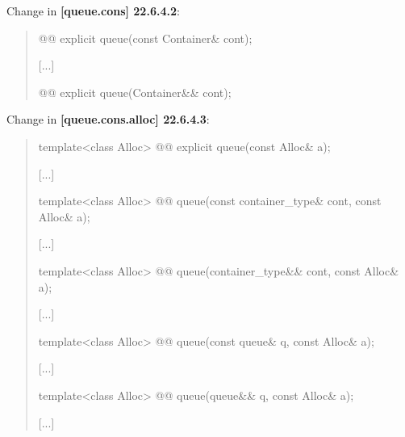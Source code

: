 \documentclass{wg21}
\begin{document}
Change in \textbf{[queue.cons] 22.6.4.2}:
\begin{quote}
\begin{itemdecl}
@@ explicit queue(const Container& cont);
\end{itemdecl}
[...]
\begin{itemdecl}
@@ explicit queue(Container&& cont);
\end{itemdecl}
\end{quote}

Change in \textbf{[queue.cons.alloc] 22.6.4.3}:
\begin{quote}
\begin{itemdecl}
template<class Alloc> @@ explicit queue(const Alloc& a);
\end{itemdecl}
[...]
\begin{itemdecl}
template<class Alloc> @@ queue(const container_type& cont, const Alloc& a);	
\end{itemdecl}
[...]
\begin{itemdecl}
template<class Alloc> @@ queue(container_type&& cont, const Alloc& a);
\end{itemdecl}
[...]
\begin{itemdecl}
template<class Alloc> @@ queue(const queue& q, const Alloc& a);	
\end{itemdecl}
[...]
\begin{itemdecl}
template<class Alloc> @@ queue(queue&& q, const Alloc& a);
\end{itemdecl}
[...]
\end{quote}
\end{document}
